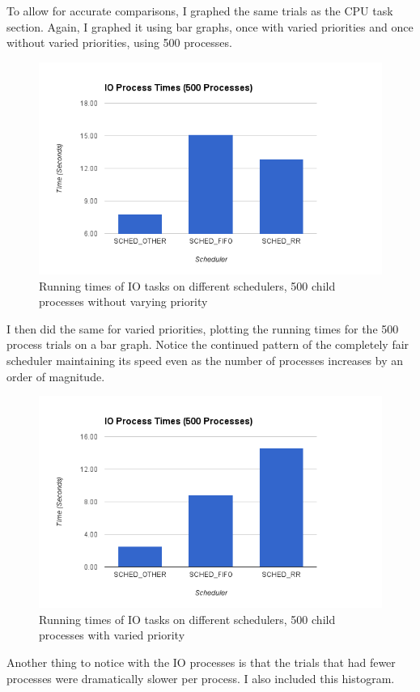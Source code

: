 \documentclass{article}
\begin{document}
To allow for accurate comparisons, I graphed the same trials as the CPU task section. Again, I graphed it using bar graphs, once with varied priorities and once without varied priorities, using 500 processes.


\begin{figure}[H]
  \centering
  \includegraphics[width=0.8\linewidth]{IONotVaried.png}
  \caption{Running times of IO tasks on different schedulers, 500 child processes without varying priority}
\end{figure}

I then did the same for varied priorities, plotting the running times for the 500 process trials on a bar graph. Notice the continued pattern of the completely fair scheduler maintaining its speed even as the number of processes increases by an order of magnitude.


\begin{figure}[H]
  \centering
  \includegraphics[width=0.8\linewidth]{IOVaried.png}
  \caption{Running times of IO tasks on different schedulers, 500 child processes with varied priority}
\end{figure}

Another thing to notice with the IO processes is that the trials that had fewer processes were dramatically slower per process. I also included this histogram.
\end{document}
